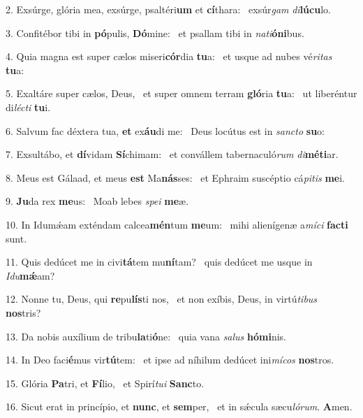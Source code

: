 2. Exsúrge, glória mea, exsúrge, psaltéri\textbf{um} et \textbf{cí}thara: \ast\  exsúr\textit{gam} \textit{di}\textbf{lú}\textbf{cu}lo.\

3. Confitébor tibi in \textbf{pó}pulis, \textbf{Dó}mine: \ast\  et psallam tibi in \textit{na}\textit{ti}\textbf{ó}\textbf{ni}bus.\

4. Quia magna est super cælos miseri\textbf{cór}dia \textbf{tu}a: \ast\  et usque ad nubes vé\textit{ri}\textit{tas} \textbf{tu}a:\

5. Exaltáre super cælos, Deus, \dag\  et super omnem terram \textbf{gló}ria \textbf{tu}a: \ast\  ut liberéntur di\textit{léc}\textit{ti} \textbf{tu}i.\

6. Salvum fac déxtera tua, \textbf{et} ex\textbf{áu}di me: \ast\  Deus locútus est in \textit{sanc}\textit{to} \textbf{su}o:\

7. Exsultábo, et \textbf{dí}vidam \textbf{Sí}chimam: \ast\  et convállem tabernaculó\textit{rum} \textit{di}\textbf{mé}\textbf{ti}ar.\

8. Meus est Gálaad, et meus \textbf{est} Ma\textbf{nás}ses: \ast\  et Ephraim suscéptio cá\textit{pi}\textit{tis} \textbf{me}i.\

9. \textbf{Ju}da rex \textbf{me}us: \ast\  Moab lebes \textit{spe}\textit{i} \textbf{me}æ.\

10. In Idumǽam exténdam calcea\textbf{mén}tum \textbf{me}um: \ast\  mihi alienígenæ a\textit{mí}\textit{ci} \textbf{fac}\textbf{ti} sunt.\

11. Quis dedúcet me in civi\textbf{tá}tem mu\textbf{ní}tam? \ast\  quis dedúcet me usque in \textit{I}\textit{du}\textbf{mǽ}am?\

12. Nonne tu, Deus, qui \textbf{re}pu\textbf{lís}ti nos, \ast\  et non exíbis, Deus, in virtú\textit{ti}\textit{bus} \textbf{nos}tris?\

13. Da nobis auxílium de tribu\textbf{la}ti\textbf{ó}ne: \ast\  quia vana \textit{sa}\textit{lus} \textbf{hó}\textbf{mi}nis.\

14. In Deo faci\textbf{é}mus vir\textbf{tú}tem: \ast\  et ipse ad níhilum dedúcet ini\textit{mí}\textit{cos} \textbf{nos}tros.\

15. Glória \textbf{Pa}tri, et \textbf{Fí}lio, \ast\  et Spirí\textit{tu}\textit{i} \textbf{Sanc}to.\

16. Sicut erat in princípio, et \textbf{nunc}, et \textbf{sem}per, \ast\  et in sǽcula sæcu\textit{ló}\textit{rum}. \textbf{A}men.\

